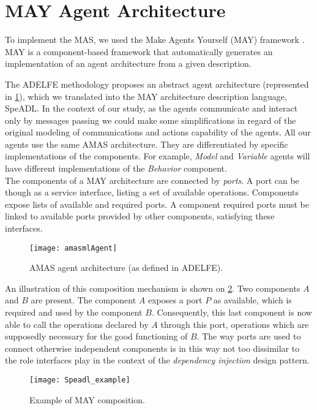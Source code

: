 \section{MAY Agent Architecture}

To implement the MAS, we used the Make Agents Yourself (MAY) framework \cite{No2012.2}. MAY is a component-based framework that automatically generates an implementation of an agent architecture from a given description.

The ADELFE methodology proposes an abstract agent architecture (represented in \figurename{} \ref{AMAS-ML_agent}), which we translated into the MAY architecture description language, SpeADL. In the context of our study, as the agents communicate and interact only by messages passing we could make some simplifications in regard of the original modeling of communications and actions capability of the agents. All our agents use the same AMAS architecture. They are differentiated by specific implementations of the components. For example, \emph{Model} and \emph{Variable} agents will have different implementations of the \emph{Behavior} component.\\
The components of a MAY architecture are connected by \emph{ports}. A port can be though as a service interface, listing a set of available operations. Components expose lists of available and required ports. A component required ports must be linked to available ports provided by other components, satisfying these interfaces.

\begin{figure}
\centering
\texttt{[image: amasmlAgent]}
\caption{AMAS agent architecture (as defined in ADELFE).}\label{AMAS-ML_agent}
\end{figure}

An illustration of this composition mechanism is shown on \figurename{} \ref{Speadl_example}. Two components $A$ and $B$ are present. The component $A$ exposes a port $P$ as available, which is required and used by the component $B$. Consequently, this last component is now able to call the operations declared by $A$ through this port, operations which are supposedly necessary for the good functioning of $B$. The way ports are used to connect otherwise independent components is in this way not too dissimilar to the role interfaces play in the context of the \emph{dependency injection} design pattern.

\begin{figure}
\centering
\texttt{[image: Speadl\_example]}
\caption{Example of MAY composition.}\label{Speadl_example}
\end{figure}

